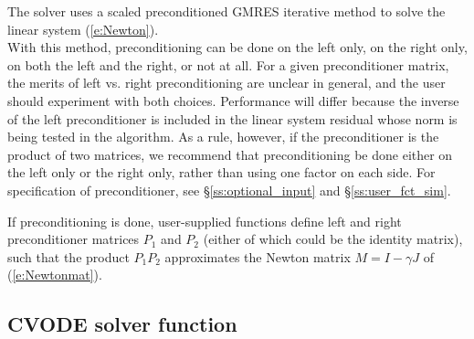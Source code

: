 {
  The {\cvspgmr} solver uses a scaled preconditioned GMRES
  iterative method to solve the linear system (\ref{e:Newton}).\\
  With this {\spgmr} method, preconditioning 
  can be done on the left only, on the right only, on both the left and the right, 
  or not at all.  For a given preconditioner matrix, the merits of left vs. right
  preconditioning are unclear in general, and the user should experiment
  with both choices.  Performance will differ because the inverse of the
  left preconditioner is included in the linear system residual whose
  norm is being tested in the {\spgmr} algorithm.  As a rule, however, if
  the preconditioner is the product of two matrices, we recommend that
  preconditioning be done either on the left only or the right only,
  rather than using one factor on each side. For specification of preconditioner,
  see \S\ref{ss:optional_input} and \S\ref{ss:user_fct_sim}.

  If preconditioning is done, user-supplied functions define left and right 
  preconditioner matrices $P_1$ and $P_2$ (either of which could be the identity
  matrix), such that the product $P_1 P_2$ approximates the Newton matrix
  $M=I-\gamma J$ of (\ref{e:Newtonmat}).
}

\subsection{CVODE solver function}\label{sss:cvode}

